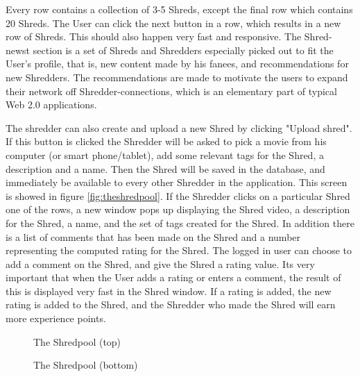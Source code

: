 \begin{description}
Every row contains a collection of 3-5 Shreds, except the final row which contains 20 Shreds. The User can click the next button in a row, which results in a new row of Shreds. This should also happen very fast and responsive. The Shred-newst section is a set of Shreds and Shredders especially picked out to fit the User's profile, that is, new content made by his fanees, and recommendations for new Shredders. The recommendations are made to motivate the users to expand their network off Shredder-connections, which is an elementary part of typical Web 2.0 applications. 

The shredder can also create and upload a new Shred by clicking "Upload shred". If this button is clicked the Shredder will be asked to pick a movie from his computer (or smart phone/tablet), add some relevant tags for the Shred, a description and a name. Then the Shred will be saved in the database, and immediately be available to every other Shredder in the application. This screen is showed in figure \vref{fig:theshredpool}. If the Shredder clicks on a particular Shred one of the rows, a new window pops up displaying the Shred video, a description for the Shred, a name, and the set of tags created for the Shred. In addition there is a list of comments that has been made on the Shred and a number representing the computed rating for the Shred. The logged in user can choose to add a comment on the Shred, and give the Shred a rating value. Its very important that when the User adds a rating or enters a comment, the result of this is displayed very fast in the Shred window. If a rating is added, the new rating is added to the Shred, and the Shredder who made the Shred will earn more experience points. 
		
\begin{figure}
  \begin{center}
\end{center}
\caption{The Shredpool (top)}\label{fig:theshredpool}
\end{figure}

\begin{figure}
  \begin{center}
\end{center}
\caption{The Shredpool (bottom)}\label{fig:theshredpool}
\end{figure}


\end{description}
